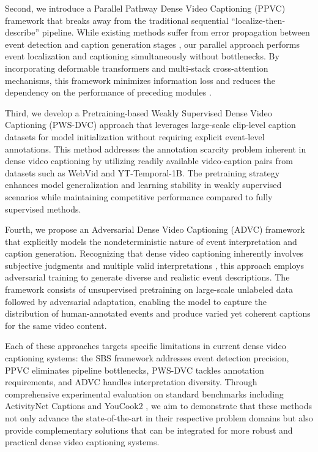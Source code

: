 Second, we introduce a Parallel Pathway Dense Video Captioning (PPVC) framework that breaks away from the traditional sequential ``localize-then-describe'' pipeline.
While existing methods suffer from error propagation between event detection and caption generation stages \cite{Zhou2018-zu, Mun2019-ap}, our parallel approach performs event localization and captioning simultaneously without bottlenecks. 
By incorporating deformable transformers \cite{Vaswani2017-sc} and multi-stack cross-attention mechanisms, this framework minimizes information loss and reduces the dependency on the performance of preceding modules \cite{Choi2022-cu}.

Third, we develop a Pretraining-based Weakly Supervised Dense Video Captioning (PWS-DVC) approach that leverages large-scale clip-level caption datasets for model initialization without requiring explicit event-level annotations.
This method addresses the annotation scarcity problem inherent in dense video captioning \cite{Shen2017-gx, Duan2018-qf} by utilizing readily available video-caption pairs from datasets such as WebVid and YT-Temporal-1B.
The pretraining strategy enhances model generalization and learning stability in weakly supervised scenarios while maintaining competitive performance compared to fully supervised methods.

Fourth, we propose an Adversarial Dense Video Captioning (ADVC) framework that explicitly models the nondeterministic nature of event interpretation and caption generation.
Recognizing that dense video captioning inherently involves subjective judgments and multiple valid interpretations \cite{Goodfellow2014-hs}, this approach employs adversarial training to generate diverse and realistic event descriptions.
The framework consists of unsupervised pretraining on large-scale unlabeled data followed by adversarial adaptation, enabling the model to capture the distribution of human-annotated events and produce varied yet coherent captions for the same video content.

Each of these approaches targets specific limitations in current dense video captioning systems: the SBS framework addresses event detection precision, PPVC eliminates pipeline bottlenecks, PWS-DVC tackles annotation requirements, and ADVC handles interpretation diversity.
Through comprehensive experimental evaluation on standard benchmarks including ActivityNet Captions \cite{Krishna2017-pw} and YouCook2 \cite{Zhou2018-eq}, we aim to demonstrate that these methods not only advance the state-of-the-art in their respective problem domains but also provide complementary solutions that can be integrated for more robust and practical dense video captioning systems.

